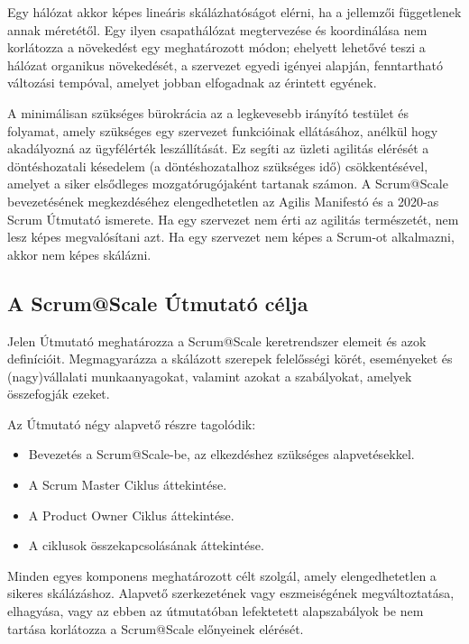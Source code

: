 \documentclass[12pt,a4paper,parskip=full]{scrartcl}
\begin{document}
Egy hálózat akkor képes lineáris skálázhatóságot elérni, ha a jellemzői függetlenek annak méretétől. Egy ilyen csapathálózat megtervezése és koordinálása nem korlátozza a növekedést egy meghatározott módon; ehelyett lehetővé teszi a hálózat organikus növekedését, a szervezet egyedi igényei alapján, fenntartható változási tempóval, amelyet jobban elfogadnak az érintett egyének.

A minimálisan szükséges bürokrácia az a legkevesebb irányító testület és folyamat, amely szükséges egy szervezet funkcióinak ellátásához, anélkül hogy akadályozná az ügyfélérték leszállítását. Ez segíti az üzleti agilitás elérését a döntéshozatali késedelem (a döntéshozatalhoz szükséges idő) csökkentésével, amelyet a siker elsődleges mozgatórugójaként tartanak számon. A Scrum@Scale bevezetésének megkezdéséhez elengedhetetlen az Agilis Manifestó és a 2020-as Scrum Útmutató ismerete. Ha egy szervezet nem érti az agilitás természetét, nem lesz képes megvalósítani azt. Ha egy szervezet nem képes a Scrum-ot alkalmazni, akkor nem képes skálázni.

\subsection{A Scrum@Scale Útmutató célja}\label{purpose-of-the-ScrumatScale-guide}

Jelen Útmutató meghatározza a Scrum@Scale keretrendszer elemeit és azok definícióit. Megmagyarázza a skálázott szerepek felelősségi körét, eseményeket és (nagy)vállalati munkaanyagokat, valamint azokat a szabályokat, amelyek összefogják ezeket.

Az Útmutató négy alapvető részre tagolódik:

\begin{itemize}
\itemsep1pt\parskip0pt
\item
 Bevezetés a Scrum@Scale-be, az elkezdéshez szükséges alapvetésekkel.
\item
 A Scrum Master Ciklus áttekintése.
\item
 A Product Owner Ciklus áttekintése.
\item
 A ciklusok összekapcsolásának áttekintése.
\end{itemize}

Minden egyes komponens meghatározott célt szolgál, amely elengedhetetlen a sikeres skálázáshoz. Alapvető szerkezetének vagy eszmeiségének megváltoztatása, elhagyása, vagy az ebben az útmutatóban lefektetett alapszabályok be nem tartása korlátozza a Scrum@Scale előnyeinek elérését.
\end{document}
